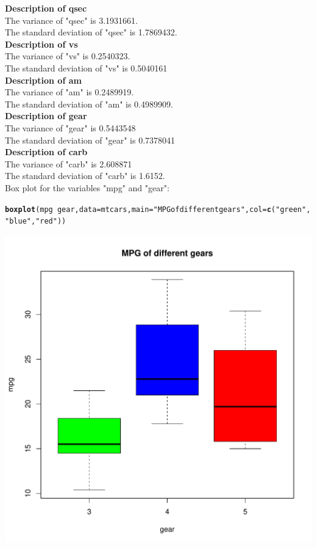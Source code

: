 \documentclass{article}\usepackage[]{graphicx}\usepackage[]{color}
\makeatletter
\def\maxwidth{ %
  \ifdim\Gin@nat@width>\linewidth
    \linewidth
  \else
    \Gin@nat@width
  \fi
}
\newcommand{\hlstr}[1]{\textcolor[rgb]{0.192,0.494,0.8}{#1}}%
\newcommand{\hlopt}[1]{\textcolor[rgb]{0,0,0}{#1}}%
\newcommand{\hlstd}[1]{\textcolor[rgb]{0.345,0.345,0.345}{#1}}%
\newcommand{\hlkwc}[1]{\textcolor[rgb]{0.333,0.667,0.333}{#1}}%
\newcommand{\hlkwd}[1]{\textcolor[rgb]{0.737,0.353,0.396}{\textbf{#1}}}%
\newenvironment{kframe}{%
 \def\at@end@of@kframe{}%
 \ifinner\ifhmode%
  \def\at@end@of@kframe{\end{minipage}}%
  \begin{minipage}{\columnwidth}%
 \fi\fi%
 \def\FrameCommand##1{\hskip\@totalleftmargin \hskip-\fboxsep
 \colorbox{shadecolor}{##1}\hskip-\fboxsep
     \hskip-\linewidth \hskip-\@totalleftmargin \hskip\columnwidth}%
 \MakeFramed {\advance\hsize-\width
   \@totalleftmargin\z@ \linewidth\hsize
   \@setminipage}}%
 {\par\unskip\endMakeFramed%
 \at@end@of@kframe}
\newenvironment{knitrout}{}{} %
\makeatother
\begin{document}
\textbf{Description of qsec}\\
The variance of "qsec" is 3.1931661.\\
The standard deviation of "qsec" is 1.7869432.\\

\textbf{Description of vs}\\
The variance of "vs" is 0.2540323.\\
The standard deviation of "vs" is 0.5040161\\

\textbf{Description of am}\\
The variance of "am" is 0.2489919.\\
The standard deviation of "am" is 0.4989909.\\

\textbf{Description of gear}\\
The variance of "gear" is 0.5443548\\
The standard deviation of "gear" is 0.7378041\\

\textbf{Description of carb}\\
The variance of "carb" is 2.608871\\
The standard deviation of "carb" is 1.6152.\\


Box plot for the variables "mpg" and "gear":
\begin{knitrout}
\color{fgcolor}\begin{kframe}
\begin{alltt}
\hlkwd{boxplot}\hlstd{(mpg} \hlopt{~} \hlstd{gear,}\hlkwc{data}\hlstd{=mtcars,}\hlkwc{main}\hlstd{=}\hlstr{"MPG of different gears"}\hlstd{,}\hlkwc{col}\hlstd{=} \hlkwd{c}\hlstd{(}\hlstr{"green"}\hlstd{,}\hlstr{"blue"}\hlstd{,}\hlstr{"red"}\hlstd{))}
\end{alltt}
\end{kframe}
\includegraphics[width=\maxwidth]{figure/Code3_-1} 
\end{knitrout}
\end{document}
